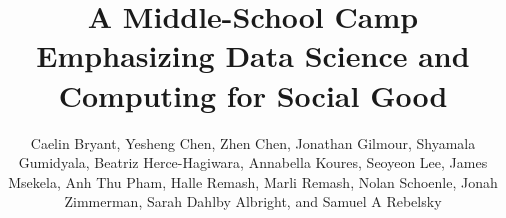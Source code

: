 \documentclass[sigconf]{acmart}
\begin{document}
\title[A Middle School Camp: Data Science \& Computing for Social Good]{A Middle-School Camp Emphasizing Data Science and Computing for Social Good}

\author{Caelin Bryant, Yesheng Chen, Zhen Chen, Jonathan Gilmour, Shyamala Gumidyala, Beatriz Herce-Hagiwara, Annabella Koures, Seoyeon Lee, James Msekela, Anh Thu Pham, Halle Remash, Marli Remash, Nolan Schoenle, Jonah Zimmerman, Sarah Dahlby Albright, and Samuel A Rebelsky}

\renewcommand{\shortauthors}{Bryant \textit{et al.}}





\maketitle






\balance
 
\end{document}
